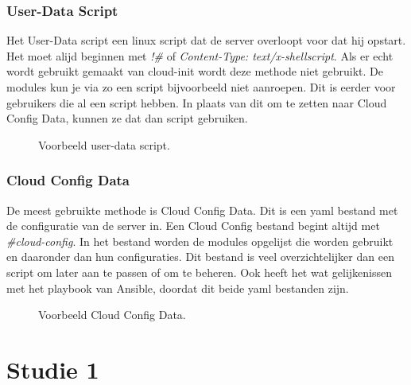 \subsubsection{User-Data Script}
Het User-Data script een linux script dat de server overloopt voor dat hij opstart. Het moet alijd beginnen met \textit{!\#} of \textit{Content-Type: text/x-shellscript}. Als er echt wordt gebruikt gemaakt van cloud-init wordt deze methode niet gebruikt. De modules kun je via zo een script bijvoorbeeld niet aanroepen. Dit is eerder voor gebruikers die al een script hebben. In plaats van dit om te zetten naar Cloud Config Data, kunnen ze dat dan script gebruiken.
\begin{figure}[!htb]
	\caption{Voorbeeld user-data script.}
	\label{fig:udatascript}
\end{figure}

\subsubsection{Cloud Config Data}
De meest gebruikte methode is Cloud Config Data. Dit is een yaml bestand met de configuratie van de server in. Een Cloud Config bestand begint altijd met \textit{\#cloud-config}. In het bestand worden de modules opgelijst die worden gebruikt en daaronder dan hun configuraties. Dit bestand is veel overzichtelijker dan een script om later aan te passen of om te beheren. Ook heeft het wat gelijkenissen met het playbook van Ansible, doordat dit beide yaml bestanden zijn.
\begin{figure}[!htb]
	\caption{Voorbeeld Cloud Config Data.}
	\label{fig:udatascript}
\end{figure}

\section{Studie 1}

